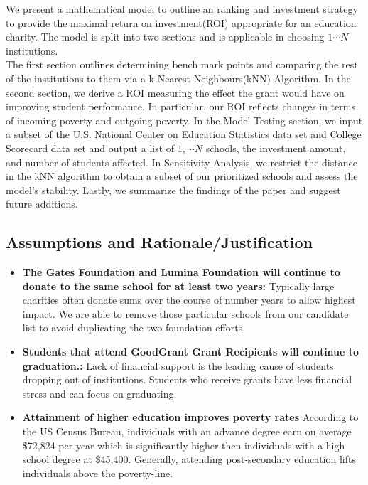\documentclass[12pt]{scrartcl}
\begin{document}
		We present a mathematical model to outline an ranking and investment strategy to provide the maximal return on investment(ROI) appropriate for an education charity.  The model is split into two sections and is applicable in choosing $1\cdots N$ institutions. \\

The first section outlines determining bench mark points and comparing the rest of the institutions to them via a k-Nearest Neighbours(kNN) Algorithm. In the second section, we derive a ROI measuring the effect the grant would have on improving student performance. In particular, our ROI reflects changes in terms of incoming poverty and outgoing poverty. In the Model Testing section, we input a subset of the U.S. National Center on Education Statistics data set and College Scorecard data set and output a list of $1,\cdots{N}$ schools, the investment amount, and number of students affected. In Sensitivity Analysis, we restrict the distance in the kNN algorithm to obtain a subset of our prioritized schools and assess the model's stability. Lastly, we summarize the findings of the paper and suggest future additions. 
	
	\subsection{Assumptions and Rationale/Justification}
	\begin{itemize}
		\item \textbf{The Gates Foundation and Lumina Foundation will continue to donate to the same school for at least two years:} Typically large charities often donate sums over the course of number years to allow highest impact. \cite{Conkey} We are able to remove those particular schools from our candidate list to avoid duplicating the two foundation efforts. 
				
		\item \textbf{Students that attend GoodGrant Grant Recipients will continue to graduation.:}  Lack of financial support is the leading cause of students dropping out of institutions. Students who receive grants have less financial stress and can focus on graduating.\cite{Trom}
		
		\item \textbf{Attainment of higher education improves poverty rates} According to the US Census Bureau, individuals with an advance degree earn on average \$72,824 per year which is significantly higher then individuals with a high school degree at \$45,400.\cite{dis} Generally, attending post-secondary education lifts individuals above the poverty-line. 

	\end{itemize}
	
\end{document}
